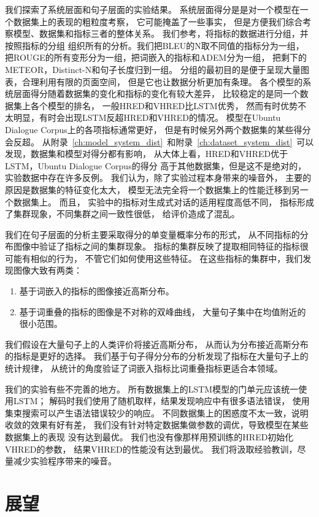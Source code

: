 我们探索了系统层面和句子层面的实验结果。
系统层面得分是是对一个模型在一个数据集上的表现的粗粒度考察，
它可能掩盖了一些事实，
但是方便我们综合考察模型、数据集和指标三者的整体关系。
我们参考\cite{HowNot}，将指标的数据进行分组，并按照指标的分组
组织所有的分析。我们把BLEU的N取不同值的指标分为一组，
把ROUGE的所有变形分为一组，把词嵌入的指标和ADEM分为一组，
把剩下的METEOR，Distinct-N和句子长度归到一组。
分组的最初目的是便于呈现大量图表，合理利用有限的页面空间，
但是它也让数据分析更加有条理。
各个模型的系统层面得分随着数据集的变化和指标的变化有较大差异，
比较稳定的是同一个数据集上各个模型的排名，
一般HRED和VHRED比LSTM优秀，
然而有时优势不太明显，有时会出现LSTM反超HRED和VHRED的情况。
模型在Ubuntu Dialogue Corpus上的各项指标通常更好，
但是有时候另外两个数据集的某些得分会反超。
从附录~\ref{ch:model_system_dist}~和附录~\ref{ch:dataset_system_dist}~可以发现，数据集和模型对得分都有影响，
从大体上看，HRED和VHRED优于LSTM，Ubuntu Dialogue Corpus的得分
高于其他数据集，但是这不是绝对的，实验数据中存在许多反例。
我们认为，除了实验过程本身带来的噪音外，
主要的原因是数据集的特征变化太大，
模型无法完全将一个数据集上的性能迁移到另一个数据集上。
而且，
实验中的指标对生成式对话的适用程度高低不同，
指标形成了集群现象，不同集群之间一致性很低，
给评价造成了混乱。

我们在句子层面的分析主要采取得分的单变量概率分布的形式，
从不同指标的分布图像中验证了指标之间的集群现象。
指标的集群反映了提取相同特征的指标很可能有相似的行为，
不管它们如何使用这些特征。
在这些指标的集群中，我们发现图像大致有两类：
\begin{enumerate}
    \item 基于词嵌入的指标的图像接近高斯分布。
    \item 基于词重叠的指标的图像是不对称的双峰曲线，
    大量句子集中在均值附近的很小范围。
\end{enumerate}
我们假设在大量句子上的人类评价将接近高斯分布，
从而认为分布接近高斯分布的指标是更好的选择。
我们基于句子得分分布的分析发现了指标在大量句子上的统计规律，
从统计的角度验证了词嵌入指标比词重叠指标更适合本领域。

我们的实验有些不完善的地方。
所有数据集上的LSTM模型的门单元应该统一使用LSTM；
解码时我们使用了随机取样，结果发现响应中有很多语法错误，
使用集束搜索可以产生语法错误较少的响应。
不同数据集上的困惑度不太一致，说明收敛的效果有好有差，
我们没有针对特定数据集做参数的调优，导致模型在某些数据集上的表现
没有达到最优。
我们也没有像\cite{VHRED}那样用预训练的HRED初始化VHRED的参数，
结果VHRED的性能没有达到最优。
我们将汲取经验教训，尽量减少实验程序带来的噪音。

\section{展望}\label{sec:future_work}
